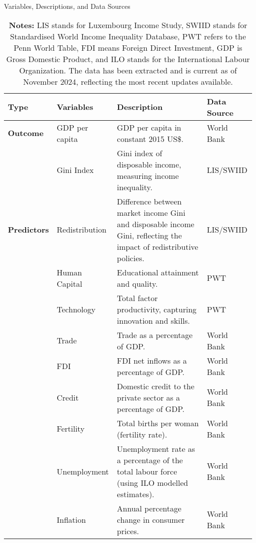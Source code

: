 \begin{table}[H]
\centering
\footnotesize
\renewcommand{\arraystretch}{1.5} %
\caption{Variables, Descriptions, and Data Sources}
\label{tab:var}
\begin{tabular}{|p{2cm}|p{3cm}|p{7cm}|l|}
\hline
\textbf{Type} & \textbf{Variables} & \textbf{Description} & \textbf{Data Source} \\
\hline
\textbf{Outcome} & GDP per capita & GDP per capita in constant 2015 US\$. & World Bank \\
\cline{2-4}
& Gini Index & Gini index of disposable income, measuring income inequality. & LIS/SWIID\\
\hline
\textbf{Predictors} & Redistribution & Difference between market income Gini and disposable income Gini, reflecting the impact of redistributive policies.& LIS/SWIID\\
\cline{2-4}
& Human Capital & Educational attainment and quality. & PWT \\
\cline{2-4}
& Technology & Total factor productivity, capturing innovation and skills. & PWT \\
\cline{2-4}
& Trade & Trade as a percentage of GDP. & World Bank \\
\cline{2-4}
& FDI & FDI net inflows as a percentage of GDP. & World Bank \\
\cline{2-4}
& Credit & Domestic credit to the private sector as a percentage of GDP. & World Bank \\
\cline{2-4}
& Fertility & Total births per woman (fertility rate). & World Bank \\
\cline{2-4}
& Unemployment & Unemployment rate as a percentage of the total labour force (using ILO modelled estimates). & World Bank \\
\cline{2-4}
& Inflation & Annual percentage change in consumer prices. & World Bank \\
\hline
\end{tabular}
\vspace{0.2cm}
\captionsetup{font=footnotesize}
    \caption*{\textbf{Notes:} LIS stands for Luxembourg Income Study, SWIID stands for Standardised World Income Inequality Database, PWT refers to the Penn World Table, FDI means Foreign Direct Investment, GDP is Gross Domestic Product, and ILO stands for the International Labour Organization. The data has been extracted and is current as of November 2024, reflecting the most recent updates available.}
\end{table}